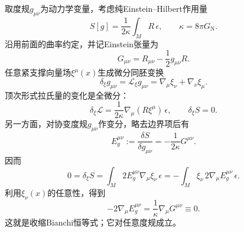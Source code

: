 \begin{example}[Einstein引力与收缩Bianchi恒等式]
    取度规$g_{\mu\nu}$为动力学变量，考虑纯Einstein--Hilbert作用量
    \begin{equation}
        S[g]=\frac1{2\kappa}\int_MR\,\epsilon,
        \qquad \kappa=8\pi G_{\mathrm N}.
    \end{equation}
    沿用前面的曲率约定，并记Einstein张量为
    \begin{equation}
        G_{\mu\nu}=R_{\mu\nu}-\frac12g_{\mu\nu}R.
    \end{equation}
    任意紧支撑向量场$\xi^{\mu}(x)$生成微分同胚变换
    \begin{equation}
        \delta_\xi g_{\mu\nu}=\mathscr L_\xi g_{\mu\nu}
        =\nabla_{\mu}\xi_{\nu}+\nabla_{\nu}\xi_{\mu}.
    \end{equation}
    顶次形式拉氏量的变化是全微分：
    \begin{equation}
        \delta_\xi\boldsymbol{\mathcal L}
        =\frac1{2\kappa}\nabla_{\mu}(R\xi^{\mu})\,\epsilon,
        \qquad \delta_\xi S=0.
    \end{equation}
    另一方面，对协变度规$g_{\mu\nu}$作变分，略去边界项后有
    \begin{equation}
        E_g^{\mu\nu}:=\frac{\delta S}{\delta g_{\mu\nu}}
        =-\frac1{2\kappa}G^{\mu\nu}.
    \end{equation}
    因而
    \begin{equation}
        0=\delta_\xi S
        =\int_M2E_g^{\mu\nu}\nabla_{\mu}\xi_{\nu}\,\epsilon
        =-\int_M\xi_{\nu}\,2\nabla_{\mu}E_g^{\mu\nu}\,\epsilon.
    \end{equation}
    利用$\xi_{\nu}(x)$的任意性，得到
    \begin{equation}
        \boxed{-2\nabla_{\mu}E_g^{\mu\nu}
        =\frac1\kappa\nabla_{\mu}G^{\mu\nu}\equiv0.}
    \end{equation}
    这就是收缩Bianchi恒等式；它对任意度规成立。
\end{example}

